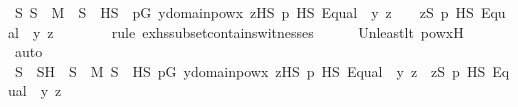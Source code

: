\begin{isabellebody}
\ {\isachardoublequoteopen}{\isasymexists}S{\isachardot}{\kern0pt}\ S\ {\isasymin}\ M\ {\isasymand}\ S\ {\isasymsubseteq}\ HS\ {\isasymand}\ {\isacharparenleft}{\kern0pt}{\isasymforall}p{\isasymin}G{\isachardot}{\kern0pt}\ {\isasymforall}y{\isasymin}domain{\isacharparenleft}{\kern0pt}powx{\isacharprime}{\kern0pt}{\isacharparenright}{\kern0pt}{\isachardot}{\kern0pt}\ {\isacharparenleft}{\kern0pt}{\isasymexists}z{\isasymin}HS{\isachardot}{\kern0pt}\ p\ {\isasymtturnstile}HS\ Equal{\isacharparenleft}{\kern0pt}{}{\isacharcomma}{\kern0pt}\ {}{\isacharparenright}{\kern0pt}\ {\isacharbrackleft}{\kern0pt}y{\isacharcomma}{\kern0pt}\ z{\isacharbrackright}{\kern0pt}\ {\isacharat}{\kern0pt}\ {\isacharbrackleft}{\kern0pt}{\isacharbrackright}{\kern0pt}{\isacharparenright}{\kern0pt}\ {\isasymlongleftrightarrow}\ {\isacharparenleft}{\kern0pt}{\isasymexists}z{\isasymin}S{\isachardot}{\kern0pt}\ p\ {\isasymtturnstile}HS\ Equal{\isacharparenleft}{\kern0pt}{}{\isacharcomma}{\kern0pt}\ {}{\isacharparenright}{\kern0pt}\ {\isacharbrackleft}{\kern0pt}y{\isacharcomma}{\kern0pt}\ z{\isacharbrackright}{\kern0pt}\ {\isacharat}{\kern0pt}\ {\isacharbrackleft}{\kern0pt}{\isacharbrackright}{\kern0pt}{\isacharparenright}{\kern0pt}{\isacharparenright}{\kern0pt}{\isachardoublequoteclose}\ \isanewline
\ \ \ \ \isamarkupfalse%
{\isacharparenleft}{\kern0pt}rule\ ex{\isacharunderscore}{\kern0pt}hs{\isacharunderscore}{\kern0pt}subset{\isacharunderscore}{\kern0pt}contains{\isacharunderscore}{\kern0pt}witnesses{\isacharparenright}{\kern0pt}\isanewline
\ \ \ \ \isamarkupfalse%
\ Un{\isacharunderscore}{\kern0pt}least{\isacharunderscore}{\kern0pt}lt\ powx{\isacharprime}{\kern0pt}H\isanewline
\ \ \ \ \isamarkupfalse%
\ auto\isanewline
\ \ \isamarkupfalse%
\ \isamarkupfalse%
\ S\ \ SH\ {\isacharcolon}{\kern0pt}\ {\isachardoublequoteopen}S\ {\isasymin}\ M{\isachardoublequoteclose}\ {\isachardoublequoteopen}S\ {\isasymsubseteq}\ HS{\isachardoublequoteclose}\ {\isachardoublequoteopen}{\isasymforall}p{\isasymin}G{\isachardot}{\kern0pt}\ {\isasymforall}y{\isasymin}domain{\isacharparenleft}{\kern0pt}powx{\isacharprime}{\kern0pt}{\isacharparenright}{\kern0pt}{\isachardot}{\kern0pt}\ {\isacharparenleft}{\kern0pt}{\isasymexists}z{\isasymin}HS{\isachardot}{\kern0pt}\ p\ {\isasymtturnstile}HS\ Equal{\isacharparenleft}{\kern0pt}{}{\isacharcomma}{\kern0pt}\ {}{\isacharparenright}{\kern0pt}\ {\isacharbrackleft}{\kern0pt}y{\isacharcomma}{\kern0pt}\ z{\isacharbrackright}{\kern0pt}{\isacharparenright}{\kern0pt}\ {\isasymlongleftrightarrow}\ {\isacharparenleft}{\kern0pt}{\isasymexists}z{\isasymin}S{\isachardot}{\kern0pt}\ p\ {\isasymtturnstile}HS\ Equal{\isacharparenleft}{\kern0pt}{}{\isacharcomma}{\kern0pt}\ {}{\isacharparenright}{\kern0pt}\ {\isacharbrackleft}{\kern0pt}y{\isacharcomma}{\kern0pt}\ z{\isacharbrackright}{\kern0pt}{\isacharparenright}{\kern0pt}{\isachardoublequoteclose}\ \isanewline

\end{isabellebody}
